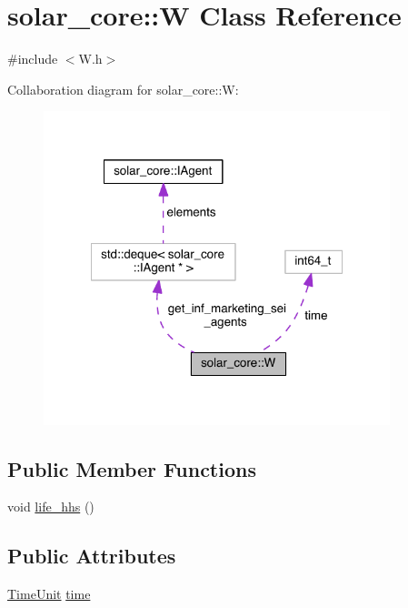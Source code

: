 \hypertarget{classsolar__core_1_1_w}{}\section{solar\+\_\+core\+:\+:W Class Reference}
\label{classsolar__core_1_1_w}


{\ttfamily \#include $<$W.\+h$>$}



Collaboration diagram for solar\+\_\+core\+:\+:W\+:
\nopagebreak
\begin{figure}[H]
\begin{center}
\leavevmode
\includegraphics[width=286pt]{classsolar__core_1_1_w__coll__graph}
\end{center}
\end{figure}
\subsection*{Public Member Functions}
{\bf }\par
\begin{DoxyCompactItemize}
\item 
void \hyperlink{classsolar__core_1_1_w_a08283dbea7c7f3fe8b7f094a96f73a78}{life\+\_\+hhs} ()
\end{DoxyCompactItemize}

\subsection*{Public Attributes}
{\bf }\par
\begin{DoxyCompactItemize}
\item 
\hyperlink{namespacesolar__core_a4b5949d07259da6f8a20d12a30403e90}{Time\+Unit} \hyperlink{classsolar__core_1_1_w_ae96b30122adc9fae8fc2f209a4c89b0a}{time}
\end{DoxyCompactItemize}

